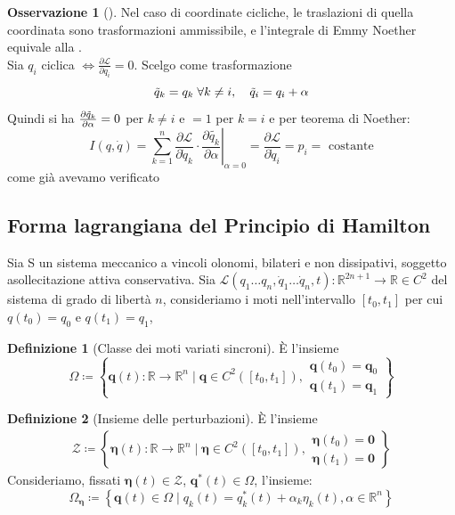 \documentclass[a4paper,10pt]{article}
\theoremstyle{definition}
\newcommand{\bv}{\boldsymbol} %
\newcommand{\re}{\mathbb{R}} %
\theoremstyle{indentdefinition}
\newtheorem{defn}{Definizione}[section]
\theoremstyle{indenttheorem}
\theoremstyle{myremark}
\newtheorem*{rem*}{Osservazione}
\theoremstyle{indentgeneral}
\begin{document}
%
\begin{rem*}[]
Nel caso di coordinate cicliche, le traslazioni di quella coordinata
sono trasformazioni ammissibile, e l'integrale di Emmy Noether equivale
alla .\\
Sia $q_i$ ciclica $\iff \frac{\partial\mathcal{L}}{\partial q_i}=0$.
Scelgo come trasformazione
$$\Tilde{q}_k=q_k\;\forall k\ne i,\quad \Tilde{q}_i=q_i+\alpha$$
Quindi si ha $\frac{\partial\Tilde{q}_k}{\partial\alpha}=0$ per $k\ne i$ e $=1$ per $k=i$ e per teorema di Noether:
$$I(q,\dot{q})=\left.\sum_{k=1}^{n}\frac{\partial\mathcal{L}}{\partial\dot{q}_{k}}\cdot\frac{\partial\widetilde{q_{k}}}{\partial\alpha}\right|_{\alpha=0}=\frac{\partial\mathcal{L}}{\partial\dot{q}_{i}}=p_i=\text{ costante}$$
come già avevamo verificato
\end{rem*}

\subsection{Forma lagrangiana del Principio di Hamilton}

Sia S un sistema meccanico a vincoli olonomi, bilateri e non dissipativi, soggetto asollecitazione attiva conservativa. Sia $\mathcal{L}(q_1\dots q_n,\dot{q}_1\dots\dot{q}_n,t):\re^{2n+1}\to\re\in C^{2}$  del sistema di grado di libertà $n$, consideriamo i moti nell'intervallo $\left[t_{0},t_{1}\right]$
per cui $q\left(t_{0}\right)=q_{0}$ e $q\left(t_{1}\right)=q_{1}$,


\begin{defn}[Classe dei moti variati sincroni]
    È l'insieme
    $$\Omega \coloneqq\left\{ \bv{q}(t)\colon\mathbb{R}\rightarrow\mathbb{R}^{n}\mid  \bv{q}\in C^{2}\left(\left[t_{0},t_{1}\right]\right),\begin{array}{l}
 \bv{q}\left(t_{0}\right)=\bv{q}_{0}\\
 \bv{q}\left(t_{1}\right)=\bv{q}_{1}
\end{array}\right\} $$
\end{defn}

\begin{defn}[Insieme delle perturbazioni]
    È l'insieme
\begin{align*}
 \mathcal{Z}\coloneqq\left\{ \bv{\eta}(t)\colon\mathbb{R}\rightarrow\mathbb{R}^{n}\mid\bv{\eta}\in C^{2}\left(\left[t_{0},t_{1}\right]\right),\begin{array}{l}
\bv{\eta}\left(t_{0}\right)=\bv{0}\\
\bv{\eta}\left(t_{1}\right)=\bv{0}
\end{array}\right\} 
\end{align*}
Consideriamo, fissati $\bv{\eta}(t)\in\mathcal{Z}$, $\bv{q}^*(t)\in\Omega$, l'insieme:
$$\Omega_{\bv{\eta}}\coloneqq\left\{ \bv{q}(t)\in\Omega\mid q_{k}(t)=q_{k}^{*}(t)+\alpha_{k}\eta_{k}(t),\alpha\in\mathbb{R}^{n}\right\} $$
\end{defn}
\end{document}
